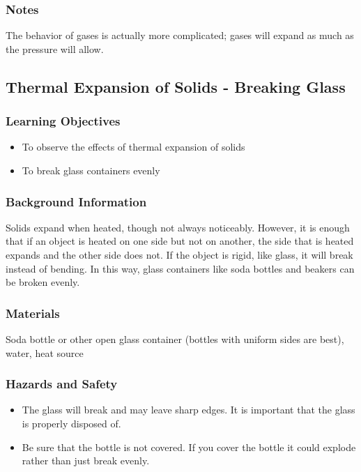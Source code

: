 \subsubsection*{Notes}
The behavior of gases is actually more complicated; gases will expand as much as the pressure will allow.

\subsection{Thermal Expansion of Solids - Breaking Glass}

\subsubsection*{Learning Objectives}
\begin{itemize}
\item{To observe the effects of thermal expansion of solids}
\item{To break glass containers evenly}
\end{itemize}

\subsubsection*{Background Information}
Solids expand when heated, though not always noticeably.  However, it is enough that if an object is heated on one side but not on another, the side that is heated expands and the other side does not.  If the object is rigid, like glass, it will break instead of bending.  In this way, glass containers like soda bottles and beakers can be broken evenly.

\subsubsection*{Materials}
Soda bottle or other open glass container (bottles with uniform sides are best), water, heat source

\subsubsection*{Hazards and Safety}
\begin{itemize}
\item{The glass will break and may leave sharp edges.  It is important that the glass is properly disposed of.}
\item{Be sure that the bottle is not covered.  If you cover the bottle it could explode rather than just break evenly.}
\end{itemize}

